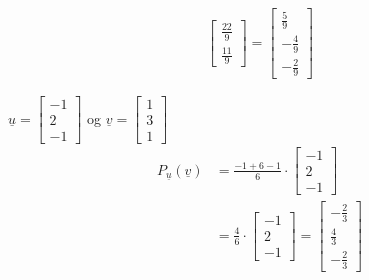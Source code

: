 \documentclass[11pt, a4paper, norsk]{NTNUoving}
\begin{document}
\begin{oppgave}
\begin{punkt}
\begin{align*}
\begin{bmatrix}
                        \frac{22}{9} \\
                        \frac{11}{9}
                    \end{bmatrix} = \begin{bmatrix}
                        \frac{5}{9} \\
                        -\frac{4}{9} \\
                        -\frac{2}{9}
                    \end{bmatrix}
            \end{align*}
        \end{punkt}
        \begin{punkt}
            $\underline{u} = \begin{bmatrix}
                -1 \\
                2 \\
                -1
            \end{bmatrix}$ og $\underline{v} = \begin{bmatrix}
                1 \\
                3 \\
                1
            \end{bmatrix}$
            \begin{align*}
                P_{\underline{u}}(\underline{v}) &= \frac{-1 + 6 - 1}{6} \cdot \begin{bmatrix}
                    -1 \\
                    2 \\
                    -1
                \end{bmatrix}
                \\
                         &= \frac{4}{6} \cdot \begin{bmatrix}
                             -1 \\
                             2 \\
                             -1
                         \end{bmatrix} = \begin{bmatrix}
                             -\frac{2}{3} \\
                             \frac{4}{3} \\
                             -\frac{2}{3}
                         \end{bmatrix}
                         \\
                         \\

\end{align*}
\end{punkt}
\end{oppgave}
\end{document}
